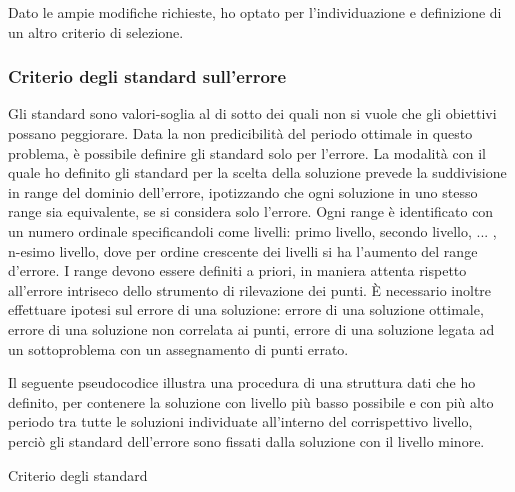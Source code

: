 \documentclass[a4paper,12pt]{report}
\begin{document}
Dato le ampie modifiche richieste, ho optato per l'individuazione e definizione di un altro criterio di selezione.

\subsubsection{Criterio degli standard sull'errore}
\label{sss:standard}
Gli standard sono valori-soglia al di sotto dei quali non si vuole che gli
obiettivi possano peggiorare. Data la non predicibilità del periodo ottimale in questo problema, è possibile definire gli standard solo per l'errore. La modalità con il quale ho definito gli standard per la scelta della soluzione prevede la suddivisione in range del dominio dell'errore, ipotizzando che ogni soluzione in uno stesso range sia equivalente, se si considera solo l'errore. Ogni range è identificato con un numero ordinale specificandoli come livelli: primo livello, secondo livello, ... , n-esimo livello, dove per ordine crescente dei livelli si ha l'aumento del range d'errore. I range devono essere definiti a priori, in maniera attenta rispetto all'errore intriseco dello strumento di rilevazione dei punti. È necessario inoltre effettuare ipotesi sul errore di una soluzione: errore di una soluzione ottimale, errore di una soluzione non correlata ai punti, errore di una soluzione legata ad un sottoproblema con un assegnamento di punti errato.

Il seguente pseudocodice illustra una procedura di una struttura dati che ho definito, per contenere la soluzione con livello più basso possibile e con più alto periodo tra tutte le soluzioni individuate all'interno del corrispettivo livello, perciò gli standard dell'errore sono fissati dalla soluzione con il livello minore.
\begin{algorithm}
\caption{Criterio degli standard}\label{alg: standard}
\eIf{\LivelloDi{\SolCorrente} $<$ \LivelloDi{\SolOttimale}}{ \label{std:min}
    $\SolOttimale \gets \SolCorrente$\\
}{\If{\LivelloDi{\SolCorrente} $=$ \LivelloDi{\SolOttimale}}{
      \eIf{\LivelloDi{\SolCorrente} $=$ \UltimoLv } {
          \If{$\SolCorrente[errore] < \SolOttimale[errore]$}{ \label{std:last}
              $\SolOttimale \gets \SolCorrente$\\
          }
       } {
          \If{$\SolCorrente[periodo] > \SolOttimale[periodo]$}{ \label{std:per}
              $\SolOttimale \gets \SolCorrente$\\
          }
       }
  }
}
\end{algorithm}
\end{document}
